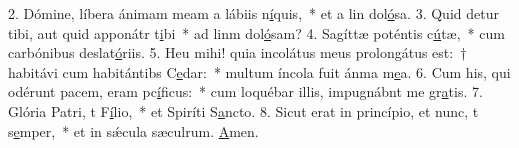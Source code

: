 2. Dómine, líbera ánimam meam a lábiis n\uline{í}quis,~* et a lin dol\uline{ó}sa.
3. Quid detur tibi, aut quid apponátr t\uline{i}bi~* ad linm dol\uline{ó}sam?
4. Sagíttæ poténtis c\uline{ú}tæ,~* cum carbónibus deslat\uline{ó}riis.
5. Heu mihi! quia incolátus meus prolongátus est:~† habitávi cum habitántibs C\uline{e}dar:~* multum íncola fuit ánma m\uline{e}a.
6. Cum his, qui odérunt pacem, eram pc\uline{í}ficus:~* cum loquébar illis, impugnábnt me gr\uline{a}tis.
7. Glória Patri, t F\uline{í}lio,~* et Spiríti S\uline{a}ncto.
8. Sicut erat in princípio, et nunc, t s\uline{e}mper,~* et in sǽcula sæculrum. \uline{A}men.

